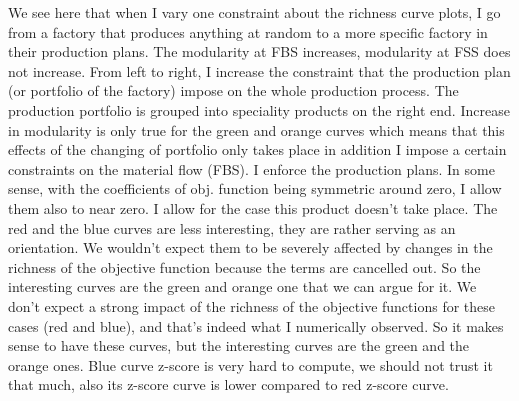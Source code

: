 {	We see here that when I vary one constraint about the richness curve plots, I go from a factory that produces anything at random to a more specific factory in their production plans. The modularity at FBS increases, modularity at FSS does not increase. From left to right, I increase the constraint that the production plan (or portfolio of the factory) impose on the whole production process. The production portfolio is grouped into speciality products on the right end. Increase in modularity is only true for the green and orange curves which means that this effects of the changing of portfolio only takes place in addition I impose a certain constraints on the material flow (FBS). I enforce the production plans. In some sense, with the coefficients of obj. function being symmetric around zero, I allow them also to near zero. I allow for the case this product doesn't take place. The red and the blue curves are less interesting, they are rather serving as an orientation. We wouldn't expect them to be severely affected by changes in the richness of the objective function because the terms are cancelled out. So the interesting curves are the green and orange one that we can argue for it. We don't expect a strong impact of the richness of the objective functions for these cases (red and blue), and that's indeed what I numerically observed. So it makes sense to have these curves, but the interesting curves are the green and the orange ones.
	Blue curve z-score is very hard to compute, we should not trust it that much, also its z-score curve is lower compared to red z-score curve. 
}








